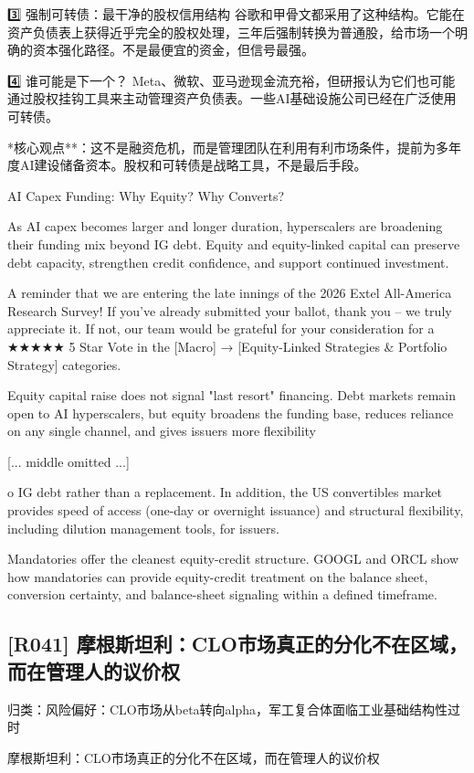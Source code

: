 \documentclass[11pt]{ctexart}
\begin{document}
3️⃣ 强制可转债：最干净的股权信用结构 谷歌和甲骨文都采用了这种结构。它能在资产负债表上获得近乎完全的股权处理，三年后强制转换为普通股，给市场一个明确的资本强化路径。不是最便宜的资金，但信号最强。

4️⃣ 谁可能是下一个？ Meta、微软、亚马逊现金流充裕，但研报认为它们也可能通过股权挂钩工具来主动管理资产负债表。一些AI基础设施公司已经在广泛使用可转债。

*核心观点**：这不是融资危机，而是管理团队在利用有利市场条件，提前为多年度AI建设储备资本。股权和可转债是战略工具，不是最后手段。

AI Capex Funding: Why Equity? Why Converts?

As AI capex becomes larger and longer duration, hyperscalers are broadening their funding mix beyond IG debt. Equity and equity-linked capital can preserve debt capacity, strengthen credit confidence, and support continued investment.

A reminder that we are entering the late innings of the 2026 Extel All-America Research Survey! If you’ve already submitted your ballot, thank you – we truly appreciate it. If not, our team would be grateful for your consideration for a ★★★★★ 5 Star Vote in the [Macro] → [Equity-Linked Strategies \& Portfolio Strategy] categories.

Equity capital raise does not signal "last resort" financing. Debt markets remain open to AI hyperscalers, but equity broadens the funding base, reduces reliance on any single channel, and gives issuers more flexibility 

[... middle omitted ...]

o IG debt rather than a replacement. In addition, the US convertibles market provides speed of access (one-day or overnight issuance) and structural flexibility, including dilution management tools, for issuers.

Mandatories offer the cleanest equity-credit structure. GOOGL and ORCL show how mandatories can provide equity-credit treatment on the balance sheet, conversion certainty, and balance-sheet signaling within a defined timeframe.

\subsection{[R041] 摩根斯坦利：CLO市场真正的分化不在区域，而在管理人的议价权}
{\small\color{refgray}归类：风险偏好：CLO市场从beta转向alpha，军工复合体面临工业基础结构性过时}

摩根斯坦利：CLO市场真正的分化不在区域，而在管理人的议价权
\end{document}
